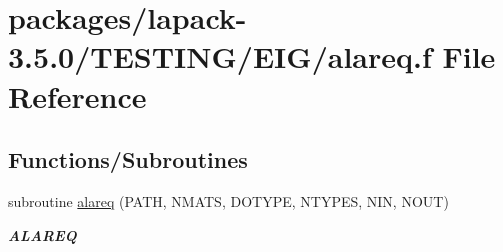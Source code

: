 \hypertarget{EIG_2alareq_8f}{}\section{packages/lapack-\/3.5.0/\+T\+E\+S\+T\+I\+N\+G/\+E\+I\+G/alareq.f File Reference}
\label{EIG_2alareq_8f}
\subsection*{Functions/\+Subroutines}
\begin{DoxyCompactItemize}
\item 
subroutine \hyperlink{group__aux__eig_ga0700b15ddc94106ea2d9fe4c97f8cdeb}{alareq} (P\+A\+T\+H, N\+M\+A\+T\+S, D\+O\+T\+Y\+P\+E, N\+T\+Y\+P\+E\+S, N\+I\+N, N\+O\+U\+T)
\begin{DoxyCompactList}\small\item\em {\bfseries A\+L\+A\+R\+E\+Q} \end{DoxyCompactList}\end{DoxyCompactItemize}
